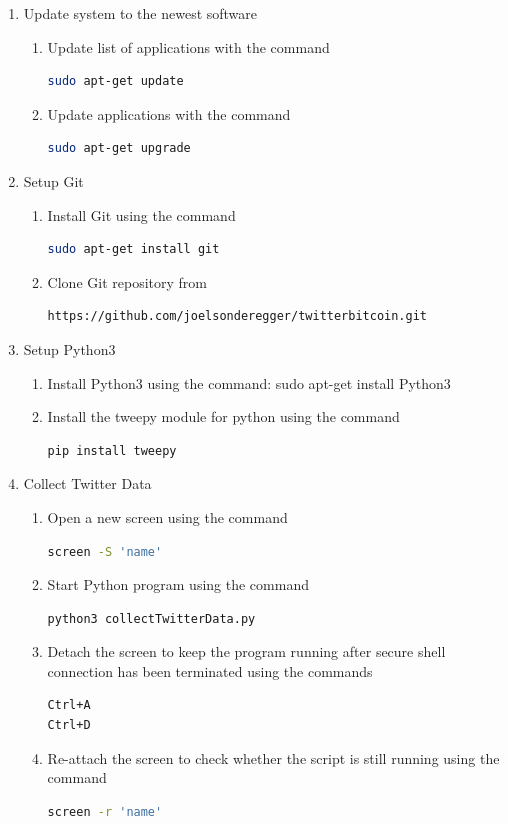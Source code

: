 \documentclass[a4paper,12pt]{article}
\begin{document}
\begin{spacing}{1.2}
\begin{enumerate}
\item Update system to the newest software
\begin{enumerate}
\item Update list of applications with the command
\begin{lstlisting}[language=bash]
sudo apt-get update
\end{lstlisting}
\item Update applications with the command
\begin{lstlisting}[language=bash]
sudo apt-get upgrade
\end{lstlisting}
\end{enumerate}

\item Setup Git
\begin{enumerate}
\item Install Git using the command
\begin{lstlisting}[language=bash]
 sudo apt-get install git
\end{lstlisting}
\item Clone Git repository from
\begin{lstlisting}[language=bash] 
https://github.com/joelsonderegger/twitterbitcoin.git
\end{lstlisting}
\end{enumerate}

\item Setup Python3
\begin{enumerate}
\item Install Python3 using the command: sudo apt-get install Python3 \newline
\item Install the tweepy module for python using the command
\begin{lstlisting}[language=bash]
pip install tweepy
\end{lstlisting}
\end{enumerate}

\item Collect Twitter Data
\begin{enumerate}
\item Open a new screen using the command
\begin{lstlisting}[language=bash] 
screen -S 'name' 
\end{lstlisting}
\item Start Python program using the command
\begin{lstlisting}[language=bash]
python3 collectTwitterData.py
\end{lstlisting}
\item Detach the screen to keep the program running after secure shell connection has been terminated using the commands
\begin{lstlisting}[language=bash]
Ctrl+A
Ctrl+D
\end{lstlisting}
\item Re-attach the screen to check whether the script is still running using the command
\begin{lstlisting}[language=bash]
screen -r 'name'
\end{lstlisting}
\end{enumerate}


\end{enumerate}
\end{spacing}
\end{document}
